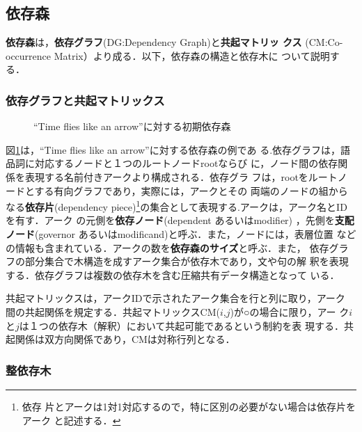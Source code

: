 \subsection{依存森}
{\bf 依存森}は，{\bf 依存グラフ}(DG:Dependency Graph)と{\bf 共起マトリッ
クス} (CM:Co-occurrence Matrix）より成る．以下，依存森の構造と依存木に
ついて説明する．

\subsubsection{依存グラフと共起マトリックス}

\begin{figure}[b]
 \begin{center}
 \end{center}
\myfiglabelskip
\caption{``Time flies like an arrow''に対する初期依存森}
\label{fig:IDF}
\end{figure}

図\ref{fig:IDF}は，``Time flies like an arrow''に対する依存森の例であ
る.依存グラフは，語品詞に対応するノードと１つのルートノードrootならび
に，ノード間の依存関係を表現する名前付きアークより構成される．依存グラ
フは，rootをルートノードとする有向グラフであり，実際には，アークとその
両端のノードの組からなる{\bf 依存片}(dependency piece)\footnote{ 依存
片とアークは1対1対応するので，特に区別の必要がない場合は依存片をアーク
と記述する．}の集合として表現する.アークは，アーク名とIDを有す．アーク
の元側を{\bf 依存ノード}(dependent あるいはmodifier) ，先側を{\bf 支配
ノード}(governor あるいはmodificand)と呼ぶ．また，ノードには，表層位置
などの情報も含まれている．アークの数を{\bf 依存森のサイズ}と呼ぶ．また，
依存グラフの部分集合で木構造を成すアーク集合が依存木であり，文や句の解
釈を表現する．依存グラフは複数の依存木を含む圧縮共有データ構造となって
いる．

共起マトリックスは，アークIDで示されたアーク集合を行と列に取り，アーク
間の共起関係を規定する．共起マトリックスCM($i$,$j$)が○の場合に限り，アー
ク$i$ と$j$は１つの依存木（解釈）において共起可能であるという制約を表
現する．共起関係は双方向関係であり，CMは対称行列となる．



\subsubsection{整依存木}

